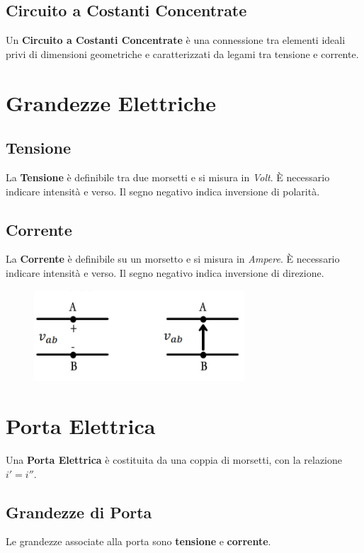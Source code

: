 \subsection*{Circuito a Costanti Concentrate}
Un \textbf{Circuito a Costanti Concentrate} è una connessione tra elementi ideali privi di dimensioni geometriche e caratterizzati da legami tra tensione e corrente.

\section{Grandezze Elettriche}

\subsection*{Tensione}
La \textbf{Tensione} è definibile tra due morsetti e si misura in \textit{Volt}. È necessario indicare intensità e verso. Il segno negativo indica inversione di polarità.

\subsection*{Corrente}
La \textbf{Corrente} è definibile su un morsetto e si misura in \textit{Ampere}. È necessario indicare intensità e verso. Il segno negativo indica inversione di direzione.

\begin{figure}[H]
    \centering
    \includegraphics[width=0.7\textwidth]{capitoli/capitolo2/immagini/image2.png}
\end{figure}

\section{Porta Elettrica}

Una \textbf{Porta Elettrica} è costituita da una coppia di morsetti, con la relazione \(i' = i''\).

\subsection*{Grandezze di Porta}
Le grandezze associate alla porta sono \textbf{tensione} e \textbf{corrente}.

